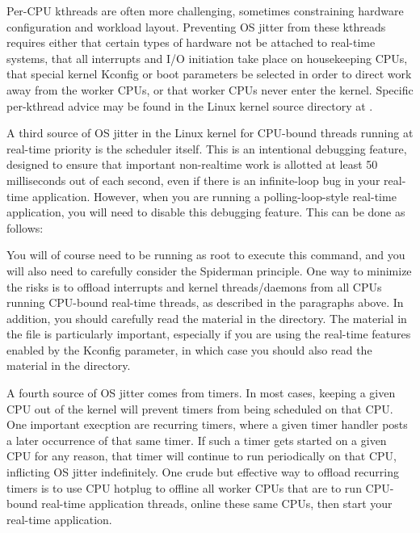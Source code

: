 Per-CPU kthreads are often more challenging, sometimes constraining
hardware configuration and workload layout.
Preventing OS jitter from these kthreads requires either that certain
types of hardware
not be attached to real-time systems, that all interrupts and I/O
initiation take place on housekeeping CPUs, that special kernel
Kconfig or boot parameters be selected in order to direct work away from
the worker CPUs, or that worker CPUs never enter the kernel.
Specific per-kthread advice may be found in the Linux kernel source
 directory at .

A third source of OS jitter in the Linux kernel for CPU-bound threads
running at real-time priority is the scheduler itself.
This is an intentional debugging feature, designed to ensure that
important non-realtime work is allotted at least 50 milliseconds
out of each second, even if there is an infinite-loop bug in
your real-time application.
However, when you are running a polling-loop-style real-time application,
you will need to disable this debugging feature.
This can be done as follows:

{
	\scriptsize
}

You will of course need to be running as root to execute this command,
and you will also need to carefully consider the Spiderman principle.
One way to minimize the risks is to offload interrupts and
kernel threads/daemons from all CPUs running CPU-bound real-time
threads, as described in the paragraphs above.
In addition, you should carefully read the material in the
 directory.
The material in the  file is particularly
important, especially if you are using the  real-time features
enabled by the  Kconfig parameter, in which
case you should also read the material in the
 directory.

A fourth source of OS jitter comes from timers.
In most cases, keeping a given CPU out of the kernel will prevent
timers from being scheduled on that CPU.
One important execption are recurring timers, where a given timer
handler posts a later occurrence of that same timer.
If such a timer gets started on a given CPU for any reason, that
timer will continue to run periodically on that CPU, inflicting
OS jitter indefinitely.
One crude but effective way to offload recurring timers is to
use CPU hotplug to offline all worker CPUs that are to run CPU-bound
real-time application threads, online these same CPUs, then start
your real-time application.

